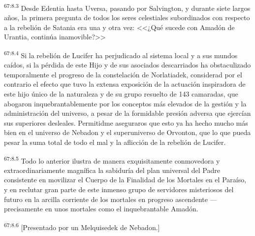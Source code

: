 \par
\textsuperscript{67:8.3} Desde Edentia hasta Uversa, pasando por Salvington, y durante siete largos años, la primera pregunta de todos los seres celestiales subordinados con respecto a la rebelión de Satania era una y otra vez: <<¿Qué sucede con Amadón de Urantia, continúa inamovible?>>

\par
\textsuperscript{67:8.4} Si la rebelión de Lucifer ha perjudicado al sistema local y a sus mundos caídos, si la pérdida de este Hijo y de sus asociados descarriados ha obstaculizado temporalmente el progreso de la constelación de Norlatiadek, considerad por el contrario el efecto que tuvo la extensa exposición de la actuación inspiradora de este hijo único de la naturaleza y de su grupo resuelto de 143 camaradas, que abogaron inquebrantablemente por los conceptos más elevados de la gestión y la administración del universo, a pesar de la formidable presión adversa que ejercían sus superiores desleales. Permitidme aseguraros que esto ya ha hecho mucho más bien en el universo de Nebadon y el superuniverso de Orvonton, que lo que pueda pesar la suma total de todo el mal y la aflicción de la rebelión de Lucifer.

\par
\textsuperscript{67:8.5} Todo lo anterior ilustra de manera exquisitamente conmovedora y extraordinariamente magnífica la sabiduría del plan universal del Padre consistente en movilizar el Cuerpo de la Finalidad de los Mortales en el Paraíso, y en reclutar gran parte de este inmenso grupo de servidores misteriosos del futuro en la arcilla corriente de los mortales en progreso ascendente ---precisamente en unos mortales como el inquebrantable Amadón.

\par
\textsuperscript{67:8.6} [Presentado por un Melquisedek de Nebadon.]